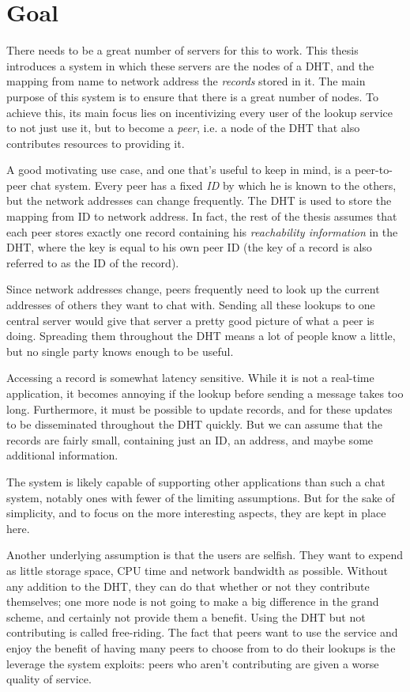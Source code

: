 \section{Goal}
There needs to be a great number of servers for this to work. This thesis
introduces a system in which these servers are the nodes of a \ac{DHT}, and the
mapping from name to network address the \emph{records} stored in it. The main
purpose of this system is to ensure that there is a great number of nodes. To
achieve this, its main focus lies on incentivizing every user of the lookup
service to not just use it, but to become a \emph{peer}, i.e. a node of the
\ac{DHT} that also contributes resources to providing it.

A good motivating use case, and one that's useful to keep in mind, is a
peer-to-peer chat system. Every peer has a fixed \emph{ID} by which he is known
to the others, but the network addresses can change frequently. The \ac{DHT} is
used to store the mapping from ID to network address. In fact, the rest of the
thesis assumes that each peer stores exactly one record containing his
\emph{reachability information} in the \ac{DHT}, where the key is equal to his
own peer ID (the key of a record is also referred to as the ID of the record).

Since network addresses change, peers frequently need to look up the current
addresses of others they want to chat with. Sending all these lookups to one
central server would give that server a pretty good picture of what a peer is
doing. Spreading them throughout the \ac{DHT} means a lot of people know a
little, but no single party knows enough to be useful.

Accessing a record is somewhat latency sensitive. While it is not a real-time
application, it becomes annoying if the lookup before sending a message takes
too long. Furthermore, it must be possible to update records, and for these
updates to be disseminated throughout the \ac{DHT} quickly. But we can assume
that the records are fairly small, containing just an ID, an address, and maybe
some additional information.

The system is likely capable of supporting other applications than such a chat
system, notably ones with fewer of the limiting assumptions. But for the sake of
simplicity, and to focus on the more interesting aspects, they are kept in place
here.

Another underlying assumption is that the users are selfish. They want to expend
as little storage space, CPU time and network bandwidth as possible. Without any
addition to the \ac{DHT}, they can do that whether or not they contribute
themselves; one more node is not going to make a big difference in the grand
scheme, and certainly not provide them a benefit. Using the DHT but not
contributing is called free-riding. The fact that peers want to use the service
and enjoy the benefit of having many peers to choose from to do their lookups is
the leverage the system exploits: peers who aren't contributing are given a
worse quality of service.

